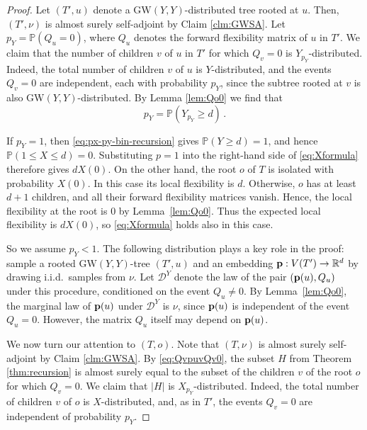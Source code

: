 \documentclass[reqno,english]{amsart}
\numberwithin{equation}{section}
\theoremstyle{definition}{
\newtheorem{example}[theorem]{Example}
\newtheorem{definition}[theorem]{Definition}
\newtheorem*{definition*}{Definition}
\newtheorem{problem}[theorem]{Problem}
\newtheorem{question}[theorem]{Question}
}
\renewcommand{\P}{\mathbb P}
\newcommand{\R}{\mathbb R}
\newcommand{\cD}{\mathcal D}
\newcommand{\p}{{\bf p}}
\begin{document}
\begin{proof}
Let $(T',u)$ denote a $\mathrm{GW}(Y,Y)$-distributed tree rooted at $u$. Then, $(T',\nu)$ is almost surely self-adjoint by Claim \ref{clm:GWSA}. 
Let $p_Y=\P(Q_u=0)$, where $Q_u$ denotes the forward flexibility matrix of $u$ in $T'$. 
We claim that the number of children $v$ of $u$ in $T'$ for which $Q_v=0$ is $Y_{p_Y}$-distributed. 
Indeed, the total number of children $v$ of $u$ is $Y$-distributed, and the events $Q_v=0$ are independent, each with probability $p_Y$, since the subtree rooted at $v$ is also $\mathrm{GW}(Y,Y)$-distributed.
By Lemma \ref{lem:Qo0} we find that 
\begin{equation}\label{eq:px-py-bin-recursion}
p_Y=\P\!\left(Y_{p_Y}\ge d\right)\,.
\end{equation}

If \(p_Y=1\), then \eqref{eq:px-py-bin-recursion} gives
\(\mathbb P(Y\ge d)=1\), and hence
    $\mathbb P(1\le X\le d)=0$.
Substituting \(p=1\) into the right-hand side of
\eqref{eq:Xformula} therefore gives \(dX(0)\).
On the other hand, the root \(o\) of \(T\) is isolated with probability
\(X(0)\). In this case its local flexibility is \(d\). Otherwise, \(o\)
has at least \(d+1\) children, and all their forward flexibility matrices
vanish. Hence, the local flexibility at the root is \(0\) by
Lemma~\ref{lem:Qo0}. Thus the expected local flexibility is \(dX(0)\),
so \eqref{eq:Xformula} holds also in this case.

So we assume $p_Y<1$. The following distribution plays a key role in the proof: sample a rooted $\mathrm{GW}(Y,Y)$-tree $(T',u)$ and an embedding $\p:V(T')\to\R^d$ by drawing i.i.d.\ samples from $\nu$. Let $\cD^Y$ denote the law of the pair $(\p(u),Q_u)$ under this procedure, conditioned on the event $Q_u\neq 0$.
By Lemma~\ref{lem:Qo0}, the marginal law of $\p(u)$ under $\cD^Y$ is $\nu$, since $\p(u)$ is independent of the event $Q_u=0$. 
However, the matrix $Q_u$ itself may depend on $\p(u)$.

\medskip


We now turn our attention to $(T,o)$. Note that $(T,\nu)$ is almost surely self-adjoint by Claim \ref{clm:GWSA}. 
By \eqref{eq:QvpuvQv0}, the subset $H$ from Theorem \ref{thm:recursion} is almost surely equal to the subset of the children $v$ of the root $o$ for which $Q_v=0$. We claim that $|H|$ is $X_{p_Y}$-distributed. Indeed, the total number of children $v$ of $o$ is $X$-distributed, and, as in $T'$, the events $Q_v=0$ are independent of probability $p_Y$. 


\end{proof}
\end{document}
